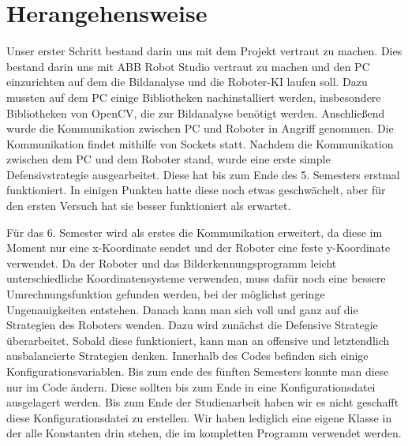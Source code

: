 \newpage

\chapter{Herangehensweise}
Unser erster Schritt bestand darin uns mit dem Projekt vertraut zu machen. Dies bestand darin uns mit ABB Robot Studio vertraut zu machen und den PC einzurichten auf dem die Bildanalyse und die Roboter-KI laufen soll. Dazu mussten auf dem PC einige Bibliotheken nachinstalliert werden, insbesondere Bibliotheken von OpenCV, die zur Bildanalyse benötigt werden. Anschließend wurde die Kommunikation zwischen PC und Roboter in Angriff genommen. Die Kommunikation findet mithilfe von Sockets statt. Nachdem die Kommunikation zwischen dem PC und dem Roboter stand, wurde eine erste simple Defensivstrategie ausgearbeitet. Diese hat bis zum Ende des 5. Semesters erstmal funktioniert. In einigen Punkten hatte diese noch etwas geschwächelt, aber für den ersten Versuch hat sie besser funktioniert als erwartet.

Für das 6. Semester wird als erstes die Kommunikation erweitert, da diese im Moment nur eine x-Koordinate sendet und der Roboter eine feste y-Koordinate verwendet. Da der Roboter und das Bilderkennungsprogramm leicht unterschiedliche Koordinatensysteme verwenden, muss dafür noch eine bessere Umrechnungsfunktion gefunden werden, bei der möglichst geringe Ungenauigkeiten entstehen. Danach kann man sich voll und ganz auf die Strategien des Roboters wenden. Dazu wird zunächst die Defensive Strategie überarbeitet. Sobald diese funktioniert, kann man an offensive und letztendlich ausbalancierte Strategien denken. Innerhalb des Codes befinden sich einige Konfigurationsvariablen. Bis zum ende des fünften Semesters konnte man diese nur im Code ändern. Diese sollten bis zum Ende in eine Konfigurationsdatei ausgelagert werden. Bis zum Ende der Studienarbeit haben wir es nicht geschafft diese Konfigurationsdatei zu erstellen. Wir haben lediglich eine eigene Klasse in der alle Konstanten drin stehen, die im kompletten Programm verwendet werden.

